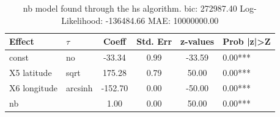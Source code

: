\begin{table}
	\caption{nb model found through the hs algorithm. bic: 272987.40 Log-Likelihood: -136484.66 MAE: 10000000.00}
	\begin{center}
		\begin{tabular}{|l|l|c|c|c|l|}
			\hline
			Effect & $\tau$ & Coeff & Std. Err & z-values & Prob |z|>Z \\
			\hline
			const & no & -33.34 & 0.99 & -33.59 & 0.00*** \\
			\hline
			X5 latitude & sqrt & 175.28 & 0.79 & 50.00 & 0.00*** \\
			\hline
			X6 longitude & arcsinh & -152.70 & 0.00 & -50.00 & 0.00*** \\
			\hline
			nb &  & 1.00 & 0.00 & 50.00 & 0.00*** \\
			\hline
		\end{tabular}
	\end{center}
\end{table}